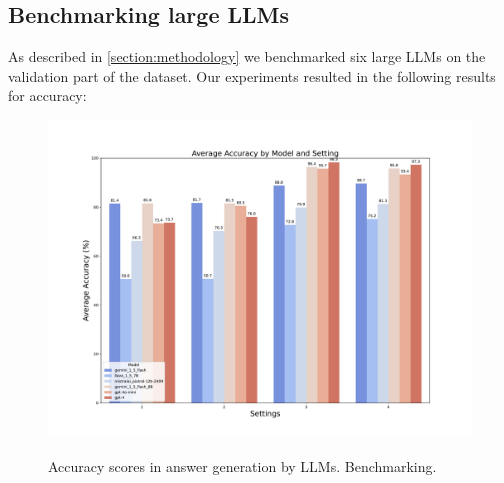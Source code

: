 \documentclass{article}
\begin{document}
\subsection{Benchmarking large LLMs}
As described in \ref{section:methodology} we benchmarked six large LLMs on the validation part of the dataset. Our experiments resulted in the following results for accuracy:
\begin{figure} [h]
    \centering
    \includegraphics[width=1\linewidth]{acc_average.pdf}
    \label{fig:benchmark_accuracy}
    \caption{Accuracy scores in answer generation by LLMs. Benchmarking.}
\end{figure}
\end{document}
